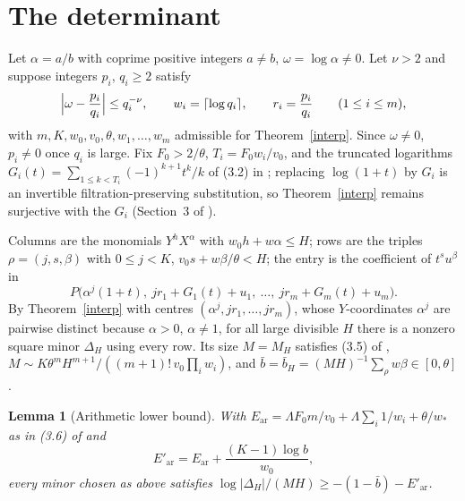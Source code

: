 \documentclass[11pt]{amsart}
\newtheorem{lemma}{Lemma}[section]
\begin{document}
\section{The determinant}\label{sec:det}

Let $\alpha=a/b$ with coprime positive integers $a\ne b$, $\omega=\log\alpha\ne0$. Let $\nu>2$ and suppose integers $p_i$, $q_i\ge2$ satisfy
\begin{equation}\label{3.1}
\Bigl|\omega-\frac{p_i}{q_i}\Bigr|\le q_i^{-\nu},\qquad w_i=\lceil\log q_i\rceil,\qquad r_i=\frac{p_i}{q_i}\qquad(1\le i\le m),
\end{equation}
with $m,K,w_0,v_0,\theta,w_1,\dots,w_m$ admissible for Theorem~\ref{interp}. Since $\omega\ne0$, $p_i\ne0$ once $q_i$ is large. Fix $F_0>2/\theta$, $T_i=F_0w_i/v_0$, and the truncated logarithms $G_i(t)=\sum_{1\le k<T_i}(-1)^{k+1}t^k/k$ of (3.2) in \cite{OAI}; replacing $\log(1+t)$ by $G_i$ is an invertible filtration-preserving substitution, so Theorem~\ref{interp} remains surjective with the $G_i$ (Section~3 of \cite{OAI}).

Columns are the monomials $Y^hX^\alpha$ with $w_0h+w\alpha\le H$; rows are the triples $\rho=(j,s,\beta)$ with $0\le j<K$, $v_0s+w\beta/\theta<H$; the entry is the coefficient of $t^su^\beta$ in
\begin{equation}\label{3.3}
P\bigl(\alpha^j(1+t),\ jr_1+G_1(t)+u_1,\ \dots,\ jr_m+G_m(t)+u_m\bigr).
\end{equation}
By Theorem~\ref{interp} with centres $(\alpha^j,jr_1,\dots,jr_m)$, whose $Y$-coordinates $\alpha^j$ are pairwise distinct because $\alpha>0$, $\alpha\ne1$, for all large divisible $H$ there is a nonzero square minor $\Delta_H$ using every row. Its size $M=M_H$ satisfies (3.5) of \cite{OAI}, $M\sim K\theta^mH^{m+1}/((m+1)!\,v_0\prod_iw_i)$, and $\bar b=\bar b_H=(MH)^{-1}\sum_\rho w\beta\in[0,\theta]$.

\begin{lemma}[Arithmetic lower bound]\label{arith}
With $E_{\mathrm{ar}}=\Lambda F_0m/v_0+\Lambda\sum_i1/w_i+\theta/w_*$ as in (3.6) of \cite{OAI} and
\[
E'_{\mathrm{ar}}=E_{\mathrm{ar}}+\frac{(K-1)\log b}{w_0},
\]
every minor chosen as above satisfies $\log|\Delta_H|/(MH)\ge-(1-\bar b)-E'_{\mathrm{ar}}$.
\end{lemma}
\end{document}
